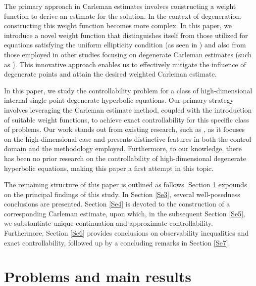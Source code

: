 \documentclass[11pt]{article}
\numberwithin{equation}{section}
\begin{document}
 The primary approach in Carleman estimates involves constructing a weight function to derive an estimate for the solution. In the context of degeneration, constructing this weight function becomes more complex. In this paper, we introduce a novel weight function that distinguishes itself from those utilized for equations satisfying the uniform ellipticity condition (as seen in \cite{Baudouin2007,FU2007}) and also from those employed in other studies focusing on degenerate Carleman estimates (such as \cite{alabau2006control,alabau2017control,Fragnelli2021}). This innovative approach enables us to effectively mitigate the influence of degenerate points and attain the desired weighted Carleman estimate.

  In this paper, we study the controllability problem for a class of high-dimensional internal single-point degenerate hyperbolic equations. Our primary strategy involves leveraging the Carleman estimate method, coupled with the introduction of suitable weight functions, to achieve
  exact  controllability for this specific class of problems. Our work stands out from existing research, such as \cite{bai2023exact,gueye2014exact,zhang2017persistent}, as it focuses on the high-dimensional case and presents distinctive features in both the control domain and the methodology employed. Furthermore, to our knowledge, there has been no prior research on the controllability of high-dimensional degenerate hyperbolic equations, making this paper a first attempt  in this topic.
		
		
		The remaining structure of this paper is outlined as follows. Section \ref{Se2} expounds on the principal findings of this study. In Section \ref{Se3}, several well-posedness conclusions are presented. Section \ref{Se4} is devoted to the construction of a corresponding Carleman estimate, upon which, in the subsequent Section \ref{Se5}, we substantiate unique continuation and approximate controllability. Furthermore, Section \ref{Se6} provides conclusions on observability inequalities and exact controllability, followed up by a concluding remarks in Section \ref{Se7}.
		
		
		
		
		\section{Problems and main results}\label{Se2}
		
\end{document}
